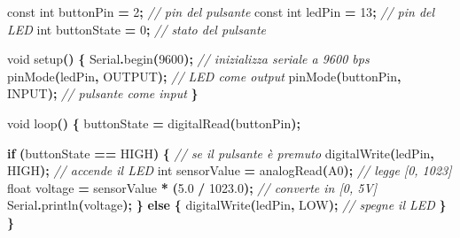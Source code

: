 \documentclass[
  italian,
  openany]{book}
\newenvironment{Shaded}{\begin{snugshade}}{\end{snugshade}}
\newcommand{\AttributeTok}[1]{\textcolor[rgb]{0.13,0.29,0.53}{#1}}
\newcommand{\CommentTok}[1]{\textcolor[rgb]{0.56,0.35,0.01}{\textit{#1}}}
\newcommand{\ControlFlowTok}[1]{\textcolor[rgb]{0.13,0.29,0.53}{\textbf{#1}}}
\newcommand{\DataTypeTok}[1]{\textcolor[rgb]{0.13,0.29,0.53}{#1}}
\newcommand{\DecValTok}[1]{\textcolor[rgb]{0.00,0.00,0.81}{#1}}
\newcommand{\FloatTok}[1]{\textcolor[rgb]{0.00,0.00,0.81}{#1}}
\newcommand{\NormalTok}[1]{#1}
\newcommand{\OperatorTok}[1]{\textcolor[rgb]{0.81,0.36,0.00}{\textbf{#1}}}
\begin{document}
\begin{Shaded}
\begin{Highlighting}[]
\AttributeTok{const} \DataTypeTok{int}\NormalTok{ buttonPin }\OperatorTok{=} \DecValTok{2}\OperatorTok{;}   \CommentTok{// pin del pulsante}
\AttributeTok{const} \DataTypeTok{int}\NormalTok{ ledPin }\OperatorTok{=} \DecValTok{13}\OperatorTok{;}     \CommentTok{// pin del LED}
\DataTypeTok{int}\NormalTok{ buttonState }\OperatorTok{=} \DecValTok{0}\OperatorTok{;}       \CommentTok{// stato del pulsante}

\DataTypeTok{void}\NormalTok{ setup}\OperatorTok{()} \OperatorTok{\{}
\NormalTok{  Serial}\OperatorTok{.}\NormalTok{begin}\OperatorTok{(}\DecValTok{9600}\OperatorTok{);}           \CommentTok{// inizializza seriale a 9600 bps}
\NormalTok{  pinMode}\OperatorTok{(}\NormalTok{ledPin}\OperatorTok{,}\NormalTok{ OUTPUT}\OperatorTok{);}      \CommentTok{// LED come output}
\NormalTok{  pinMode}\OperatorTok{(}\NormalTok{buttonPin}\OperatorTok{,}\NormalTok{ INPUT}\OperatorTok{);}    \CommentTok{// pulsante come input}
\OperatorTok{\}}

\DataTypeTok{void}\NormalTok{ loop}\OperatorTok{()} \OperatorTok{\{}
\NormalTok{  buttonState }\OperatorTok{=}\NormalTok{ digitalRead}\OperatorTok{(}\NormalTok{buttonPin}\OperatorTok{);}

  \ControlFlowTok{if} \OperatorTok{(}\NormalTok{buttonState }\OperatorTok{==}\NormalTok{ HIGH}\OperatorTok{)} \OperatorTok{\{}        \CommentTok{// se il pulsante è premuto}
\NormalTok{    digitalWrite}\OperatorTok{(}\NormalTok{ledPin}\OperatorTok{,}\NormalTok{ HIGH}\OperatorTok{);}      \CommentTok{// accende il LED}
    \DataTypeTok{int}\NormalTok{ sensorValue }\OperatorTok{=}\NormalTok{ analogRead}\OperatorTok{(}\NormalTok{A0}\OperatorTok{);}            \CommentTok{// legge [0, 1023]}
    \DataTypeTok{float}\NormalTok{ voltage }\OperatorTok{=}\NormalTok{ sensorValue }\OperatorTok{*} \OperatorTok{(}\FloatTok{5.0} \OperatorTok{/} \FloatTok{1023.0}\OperatorTok{);} \CommentTok{// converte in [0, 5V]}
\NormalTok{    Serial}\OperatorTok{.}\NormalTok{println}\OperatorTok{(}\NormalTok{voltage}\OperatorTok{);}
  \OperatorTok{\}} \ControlFlowTok{else} \OperatorTok{\{}
\NormalTok{    digitalWrite}\OperatorTok{(}\NormalTok{ledPin}\OperatorTok{,}\NormalTok{ LOW}\OperatorTok{);}       \CommentTok{// spegne il LED}
  \OperatorTok{\}}
\OperatorTok{\}}
\end{Highlighting}
\end{Shaded}
\end{document}
